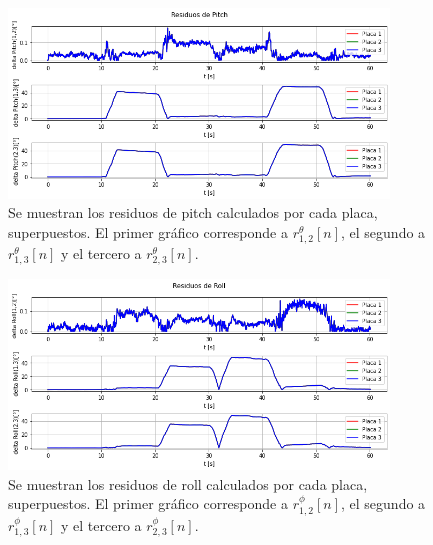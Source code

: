 \begin{figure}[H]
    \centering
    \includegraphics[width=0.9\textwidth]{img/resultados_residuos_pitch_enclavado.png}
    \caption{Se muestran los residuos de pitch calculados por cada placa, superpuestos. El primer gráfico corresponde a $r_{1,2}^{\theta}[n]$, el segundo a $r_{1,3}^{\theta}[n]$ y el tercero a $r_{2,3}^{\theta}[n]$.}
    \label{fig:resultados_residuos_pitch_enclavado}
\end{figure}

\begin{figure}[H]
    \centering
    \includegraphics[width=0.9\textwidth]{img/resultados_residuos_roll_enclavado.png}
    \caption{Se muestran los residuos de roll calculados por cada placa, superpuestos. El primer gráfico corresponde a $r_{1,2}^{\phi}[n]$, el segundo a $r_{1,3}^{\phi}[n]$ y el tercero a $r_{2,3}^{\phi}[n]$.}
    \label{fig:resultados_residuos_roll_enclavado}
\end{figure}





